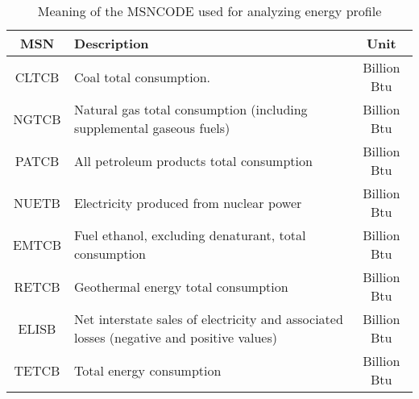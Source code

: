 \begin{table}[H]
\centering
\caption{Meaning of the MSNCODE used for analyzing energy profile}
\label{tabel: msncode}
    \begin{threeparttable}
        \begin{tabular}{clc}
        \toprule
        MSN   & Description                                                           & Unit        \\
        \midrule
CLTCB & Coal total consumption.                                               & Billion Btu \\
NGTCB & Natural gas total consumption (including supplemental gaseous fuels) & Billion Btu \\
PATCB & All petroleum products total consumption                            & Billion Btu \\
NUETB & Electricity produced from nuclear power                              & Billion Btu \\
EMTCB & Fuel ethanol, excluding denaturant, total consumption               & Billion Btu \\
RETCB & Geothermal energy total consumption                                & Billion Btu \\
ELISB & Net interstate sales of electricity and associated losses (negative and positive values)                                  & Billion Btu \\
TETCB & Total energy consumption                                  & Billion Btu \\
        \bottomrule
        \end{tabular}
    \end{threeparttable}
    
\end{table}